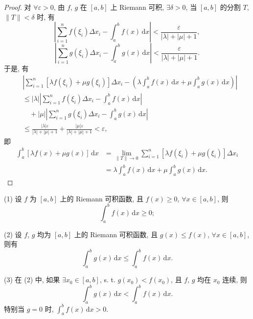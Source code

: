 \begin{proof}
对 $\forall\varepsilon>0$, 由 $f$, $g$ 在 $[a,b]$ 上 Riemann 可积, $\exists\delta>0$, 当 $[a,b]$ 的分割 $T$, $\|T\|<\delta$ 时, 有
\[
\left|\sum_{i=1}^{n}f(\xi_{i})\Delta x_{i}-\int_{a}^{b}f(x)\,\mathrm{d}x\right|<\frac{\varepsilon}{|\lambda|+|\mu|+1},
\]
\[
\left|\sum_{i=1}^{n}g(\xi_{i})\Delta x_{i}-\int_{a}^{b}g(x)\,\mathrm{d}x\right|<\frac{\varepsilon}{|\lambda|+|\mu|+1}.
\]
于是, 有
\begin{align*}
&\left|\sum_{i=1}^{n}[\lambda f(\xi_{i})+\mu g(\xi_{i})]\Delta x_{i}-\left(\lambda\int_{a}^{b}f(x)\,\mathrm{d}x+\mu\int_{a}^{b}g(x)\,\mathrm{d}x\right)\right|\\
&\leqslant|\lambda|\left|\sum_{i=1}^{n}f(\xi_{i})\Delta x_{i}-\int_{a}^{b}f(x)\,\mathrm{d}x\right|\\
&\quad+|\mu|\left|\sum_{i=1}^{n}g(\xi_{i})\Delta x_{i}-\int_{a}^{b}g(x)\,\mathrm{d}x\right|\\
&\leqslant\frac{|\lambda|\varepsilon}{|\lambda|+|\mu|+1}+\frac{|\mu|\varepsilon}{|\lambda|+|\mu|+1}<\varepsilon,
\end{align*}
即
\begin{align*}
\int_{a}^{b}[\lambda f(x)+\mu g(x)]\,\mathrm{d}x&=\lim_{\|T\|\to 0}\sum_{i=1}^{n}[\lambda f(\xi_{i})+\mu g(\xi_{i})]\Delta x_{i}\\
&=\lambda\int_{a}^{b}f(x)\,\mathrm{d}x+\mu\int_{a}^{b}g(x)\,\mathrm{d}x.
\end{align*}
\end{proof}

\begin{theorem}\label{thm:6.2.2}
(1) 设 $f$ 为 $[a,b]$ 上的 Riemann 可积函数, 且 $f(x)\geqslant 0$, $\forall x\in[a,b]$, 则
\[
\int_{a}^{b}f(x)\,\mathrm{d}x\geqslant 0;
\]

(2) 设 $f$, $g$ 均为 $[a,b]$ 上的 Riemann 可积函数, 且 $g(x)\leqslant f(x)$, $\forall x\in[a,b]$, 则有
\[
\int_{a}^{b}g(x)\,\mathrm{d}x\leqslant\int_{a}^{b}f(x)\,\mathrm{d}x.
\]

(3) 在 (2) 中, 如果 $\exists x_{0}\in[a,b]$, s. t. $g(x_{0})<f(x_{0})$, 且 $f$, $g$ 均在 $x_{0}$ 连续, 则
\[
\int_{a}^{b}g(x)\,\mathrm{d}x<\int_{a}^{b}f(x)\,\mathrm{d}x.
\]
特别当 $g=0$ 时, $\int_{a}^{b}f(x)\,\mathrm{d}x>0$.
\end{theorem}

